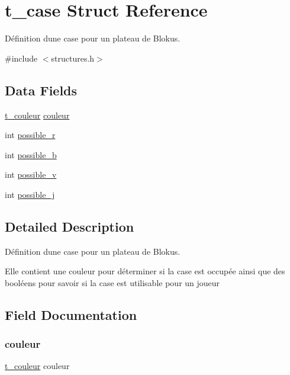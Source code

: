 \hypertarget{structt__case}{}\section{t\+\_\+case Struct Reference}
\label{structt__case}


Définition d\textquotesingle{}une case pour un plateau de Blokus.  




{\ttfamily \#include $<$structures.\+h$>$}

\subsection*{Data Fields}
\begin{DoxyCompactItemize}
\item 
\mbox{\hyperlink{structures_8h_aa9f0f93fc533400ebe242cbb9986ef07}{t\+\_\+couleur}} \mbox{\hyperlink{structt__case_a93718ab3d9418a25e7d88c15fcaa4ba2}{couleur}}
\item 
int \mbox{\hyperlink{structt__case_af044dfbf634bb4deb44becbf8ab549d8}{possible\+\_\+r}}
\item 
int \mbox{\hyperlink{structt__case_ab65cd63e09f9a6828163976ece9aeaba}{possible\+\_\+b}}
\item 
int \mbox{\hyperlink{structt__case_aeccebd9f99eb3bec0a7b2fc0633253fe}{possible\+\_\+v}}
\item 
int \mbox{\hyperlink{structt__case_a644f4e75358f7354e07c861a86467600}{possible\+\_\+j}}
\end{DoxyCompactItemize}


\subsection{Detailed Description}
Définition d\textquotesingle{}une case pour un plateau de Blokus. 

Elle contient une couleur pour déterminer si la case est occupée ainsi que des booléens pour savoir si la case est utilisable pour un joueur 

\subsection{Field Documentation}
\mbox{\label{structt__case_a93718ab3d9418a25e7d88c15fcaa4ba2}} 
\subsubsection{\texorpdfstring{couleur}{couleur}}
{\footnotesize\ttfamily \mbox{\hyperlink{structures_8h_aa9f0f93fc533400ebe242cbb9986ef07}{t\+\_\+couleur}} couleur}

